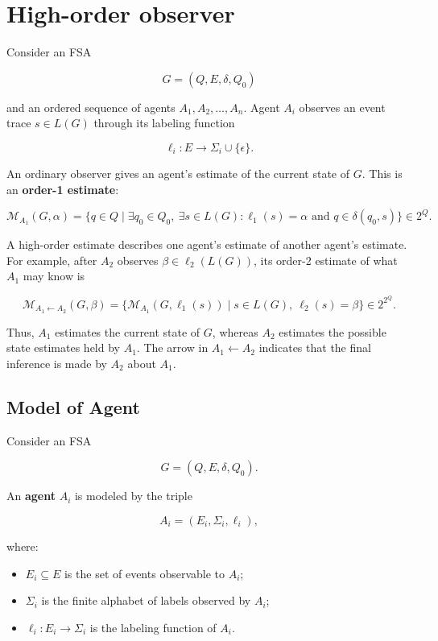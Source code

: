 \documentclass[11pt]{article}
\begin{document}


\section{High-order observer}


Consider an FSA

\[
G=(Q,E,\delta,Q_0)
\]

\noindent
and an ordered sequence of agents $A_1,A_2,\ldots,A_n$. Agent $A_i$ observes an event trace $s\in L(G)$ through its labeling function

\[
\ell_i:E\rightarrow\Sigma_i\cup\{\epsilon\}.
\]

An ordinary observer gives an agent's estimate of the current state of $G$. This is an \textbf{order-1 estimate}:

\[
\mathcal M_{A_1}(G,\alpha)
=\{q\in Q\mid
\exists q_0\in Q_0,\ 
\exists s\in L(G):
\ell_1(s)=\alpha
\text{ and }
q\in\delta(q_0,s)\}
\in 2^Q.
\]

A high-order estimate describes one agent's estimate of another agent's estimate. For example, after $A_2$ observes $\beta\in\ell_2(L(G))$, its order-2 estimate of what $A_1$ may know is

\[
\mathcal M_{A_1\leftarrow A_2}(G,\beta)
=
\{\mathcal M_{A_1}(G,\ell_1(s))
\mid
s\in L(G),\ \ell_2(s)=\beta\}
\in 2^{2^Q}.
\]

Thus, $A_1$ estimates the current state of $G$, whereas $A_2$ estimates the possible state estimates held by $A_1$. The arrow in $A_1\leftarrow A_2$ indicates that the final inference is made by $A_2$ about $A_1$.

\subsection{Model of Agent}


Consider an FSA

\[
G=(Q,E,\delta,Q_0).
\]

An \textbf{agent} $A_i$ is modeled by the triple

\[
A_i=(E_i,\Sigma_i,\ell_i),
\]

where:

\begin{itemize}
\item $E_i\subseteq E$ is the set of events observable to $A_i$;
\item $\Sigma_i$ is the finite alphabet of labels observed by $A_i$;
\item $\ell_i:E_i\rightarrow\Sigma_i$ is the labeling function of $A_i$.
\end{itemize}
\end{document}
